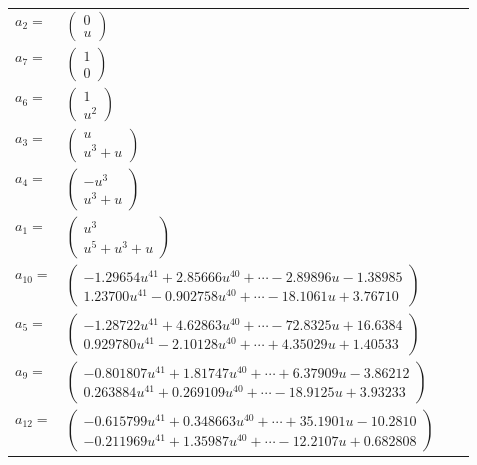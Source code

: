 \documentclass[1p]{elsarticle_modified}
\theoremstyle{definition}
\begin{document}
\begin{tabular}{m{7pt} m{180pt} m{7pt} m{180pt} }
\flushright $a_{2}=$&$\begin{pmatrix}0\\u\end{pmatrix}$ \\
\flushright $a_{7}=$&$\begin{pmatrix}1\\0\end{pmatrix}$ \\
\flushright $a_{6}=$&$\begin{pmatrix}1\\u^2\end{pmatrix}$ \\
\flushright $a_{3}=$&$\begin{pmatrix}u\\u^3+u\end{pmatrix}$ \\
\flushright $a_{4}=$&$\begin{pmatrix}- u^3\\u^3+u\end{pmatrix}$ \\
\flushright $a_{1}=$&$\begin{pmatrix}u^3\\u^5+u^3+u\end{pmatrix}$ \\
\flushright $a_{10}=$&$\begin{pmatrix}-1.29654 u^{41}+2.85666 u^{40}+\cdots-2.89896 u-1.38985\\1.23700 u^{41}-0.902758 u^{40}+\cdots-18.1061 u+3.76710\end{pmatrix}$ \\
\flushright $a_{5}=$&$\begin{pmatrix}-1.28722 u^{41}+4.62863 u^{40}+\cdots-72.8325 u+16.6384\\0.929780 u^{41}-2.10128 u^{40}+\cdots+4.35029 u+1.40533\end{pmatrix}$ \\
\flushright $a_{9}=$&$\begin{pmatrix}-0.801807 u^{41}+1.81747 u^{40}+\cdots+6.37909 u-3.86212\\0.263884 u^{41}+0.269109 u^{40}+\cdots-18.9125 u+3.93233\end{pmatrix}$ \\
\flushright $a_{12}=$&$\begin{pmatrix}-0.615799 u^{41}+0.348663 u^{40}+\cdots+35.1901 u-10.2810\\-0.211969 u^{41}+1.35987 u^{40}+\cdots-12.2107 u+0.682808\end{pmatrix}$ \\

\end{tabular}
\end{document}

